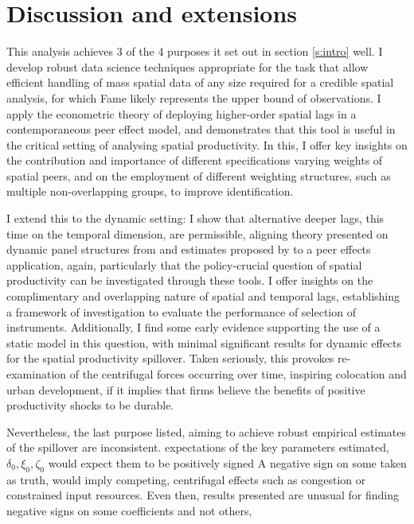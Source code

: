 \section{Discussion and extensions}
\label{s:extensions}

This analysis achieves 3 of the 4 purposes it set out in section \ref{s:intro} well.
I develop robust data science techniques appropriate for the task
that allow efficient handling of mass spatial data of any size required
for a credible spatial analysis, for which Fame likely represents the upper bound of observations.
I apply the econometric theory of deploying higher-order spatial lags
in a contemporaneous peer effect model,
and demonstrates that this tool is useful in the critical
setting of analysing spatial productivity.
In this, I offer key insights on the contribution and importance
of different specifications varying weights of spatial peers,
and on the employment of different weighting structures, such as multiple non-overlapping groups,
to improve identification.
\par
I extend this to the dynamic setting: I show that alternative deeper lags,
this time on the temporal dimension, are permissible, aligning
theory presented on dynamic panel structures from \cite{Arellano1991}
and estimates proposed by \cite{Blundell1998} to a peer effects application,
again, particularly that the policy-crucial question of spatial productivity
can be investigated through these tools.
I offer insights on the complimentary and overlapping nature
of spatial and temporal lags, establishing a framework of investigation
to evaluate the performance of selection of instruments.
Additionally, I find some early evidence supporting the use of a static model
in this question, with minimal significant results for dynamic effects
for the spatial productivity spillover.
Taken seriously, this provokes re-examination of the centrifugal forces
occurring over time, inspiring colocation and urban development,
if it implies that firms believe the benefits of positive productivity shocks
to be durable.
\par
Nevertheless, the last purpose listed, aiming to achieve robust empirical
estimates of the spillover are inconsistent.
 expectations of the key parameters estimated, $\delta_0,
\xi_0, \zeta_0$ would expect them to be positively signed 
A negative sign on some taken as truth, would imply competing,
centrifugal effects such as congestion or constrained input resources.
Even then, results presented are unusual for finding negative signs
on some coefficients and not others,
